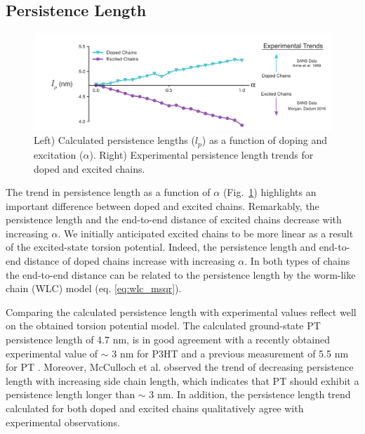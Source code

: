 \subsection{Persistence Length}

\begin{figure}[hbt!]
    \centering
    \includegraphics{figures/chap2/persist_len.pdf}
    \caption[Persistence Length Trends for Doped and Excited Chains]{Left) Calculated persistence lengths ($l_p$) as a function of doping and excitation ($\alpha$). Right) Experimental persistence length trends for doped and excited chains.}
    \label{fig:lp}
\end{figure}

The trend in persistence length as a function of $\alpha$ (Fig.~\ref{fig:lp}) highlights an important difference between doped and excited chains. Remarkably, the persistence length and the end-to-end distance of excited chains decrease with increasing $\alpha$. We initially anticipated excited chains to be more linear as a result of the excited-state torsion potential. Indeed, the persistence length and end-to-end distance of doped chains increase with increasing $\alpha$. In both types of chains the end-to-end distance can be related to the persistence length by the worm-like chain (WLC) model (eq. \ref{eq:wlc_msqr}).

Comparing the calculated persistence length with experimental values reflect well on the obtained torsion potential model. The calculated ground-state PT persistence length of 4.7 nm, is in good agreement with a recently obtained experimental value of $\sim$ 3 nm for P3HT \cite{Mcculloch2013} and a previous measurement of 5.5 nm for PT \cite{Aime1989}. Moreover, McCulloch et al. observed the trend of decreasing persistence length with increasing side chain length, which indicates that PT should exhibit a persistence length longer than $\sim$ 3 nm. In addition, the persistence length trend calculated for both doped and excited chains qualitatively agree with experimental observations.

